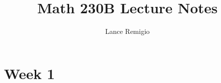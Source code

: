 \documentclass[a4paper]{article}
\title{Math 230B Lecture Notes}
\author{Lance Remigio}
\begin{document}
\maketitle
\tableofcontents

\section{Week 1}
\end{document}
